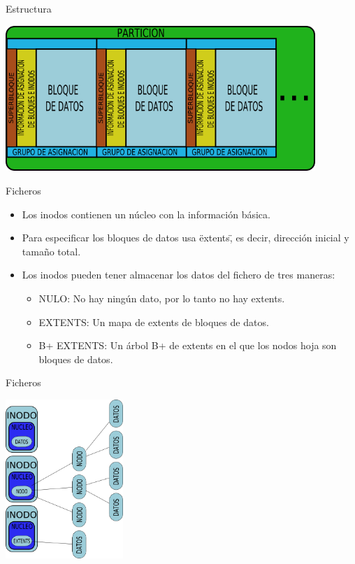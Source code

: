 \begin{frame}{Estructura}
  \begin{center}
    \includegraphics[height=5.5cm]{imgs/xfs_struct.png}
  \end{center}
\end{frame}

\begin{frame}{Ficheros}
  \begin{itemize}
    \item Los inodos contienen un núcleo con la información básica.
    \item Para especificar los bloques de datos usa \"extents\", es decir, dirección inicial y tamaño total.
    \item Los inodos pueden tener almacenar los datos del fichero de tres maneras:
    \begin{itemize}
      \item NULO: No hay ningún dato, por lo tanto no hay extents.
      \item EXTENTS: Un mapa de extents de bloques de datos.
      \item B+ EXTENTS: Un árbol B+ de extents en el que los nodos hoja son bloques de datos.
    \end{itemize}
  \end{itemize}
\end{frame}

\begin{frame}{Ficheros}
  \begin{center}
    \includegraphics[height=6cm]{imgs/xfs_files.png}
  \end{center}
\end{frame}
